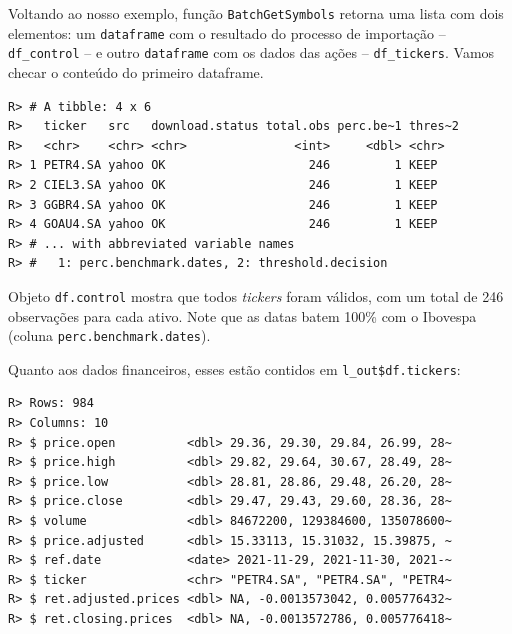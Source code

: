 \documentclass[
  11pt,
]{book}
\newenvironment{Shaded}{\begin{snugshade}}{\end{snugshade}}
\newcommand{\CommentTok}[1]{\textcolor[rgb]{0.37,0.37,0.37}{\textit{#1}}}
\newcommand{\FunctionTok}[1]{\textcolor[rgb]{0,0,0}{#1}}
\newcommand{\NormalTok}[1]{#1}
\newcommand{\SpecialCharTok}[1]{\textcolor[rgb]{0,0,0}{#1}}
\begin{document}
Voltando ao nosso exemplo, função \texttt{BatchGetSymbols} retorna uma lista com dois elementos: um \texttt{dataframe} com o resultado do processo de importação -- \texttt{df\_control} -- e outro \texttt{dataframe} com os dados das ações -- \texttt{df\_tickers}. Vamos checar o conteúdo do primeiro dataframe.

\begin{Shaded}
\end{Shaded}

\begin{verbatim}
R> # A tibble: 4 x 6
R>   ticker   src   download.status total.obs perc.be~1 thres~2
R>   <chr>    <chr> <chr>               <int>     <dbl> <chr>  
R> 1 PETR4.SA yahoo OK                    246         1 KEEP   
R> 2 CIEL3.SA yahoo OK                    246         1 KEEP   
R> 3 GGBR4.SA yahoo OK                    246         1 KEEP   
R> 4 GOAU4.SA yahoo OK                    246         1 KEEP   
R> # ... with abbreviated variable names
R> #   1: perc.benchmark.dates, 2: threshold.decision
\end{verbatim}

Objeto \texttt{df.control} mostra que todos \emph{tickers} foram válidos, com um total de 246 observações para cada ativo. Note que as datas batem 100\% com o Ibovespa (coluna \texttt{perc.benchmark.dates}).

Quanto aos dados financeiros, esses estão contidos em \texttt{l\_out\$df.tickers}:

\begin{Shaded}
\end{Shaded}

\begin{verbatim}
R> Rows: 984
R> Columns: 10
R> $ price.open          <dbl> 29.36, 29.30, 29.84, 26.99, 28~
R> $ price.high          <dbl> 29.82, 29.64, 30.67, 28.49, 28~
R> $ price.low           <dbl> 28.81, 28.86, 29.48, 26.20, 28~
R> $ price.close         <dbl> 29.47, 29.43, 29.60, 28.36, 28~
R> $ volume              <dbl> 84672200, 129384600, 135078600~
R> $ price.adjusted      <dbl> 15.33113, 15.31032, 15.39875, ~
R> $ ref.date            <date> 2021-11-29, 2021-11-30, 2021-~
R> $ ticker              <chr> "PETR4.SA", "PETR4.SA", "PETR4~
R> $ ret.adjusted.prices <dbl> NA, -0.0013573042, 0.005776432~
R> $ ret.closing.prices  <dbl> NA, -0.0013572786, 0.005776418~
\end{verbatim}
\end{document}
